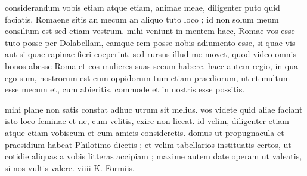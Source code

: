 


 considerandum vobis etiam atque etiam, animae meae, diligenter puto quid faciatis, Romaene sitis an mecum an aliquo tuto loco ; id non solum meum consilium est sed etiam vestrum. mihi veniunt in mentem haec, Romae vos esse tuto posse per Dolabellam, eamque rem posse nobis adiumento esse, si quae vis aut si quae rapinae fieri coeperint. sed rursus illud me movet, quod video omnis bonos abesse Roma et eos mulieres suas secum habere. haec autem regio, in qua ego sum, nostrorum est cum oppidorum tum etiam praediorum, ut et multum esse mecum et, cum abieritis, commode et in nostris esse possitis.

 mihi plane non satis constat adhuc utrum sit melius. vos videte quid aliae faciant isto loco feminae et ne, cum velitis, exire non liceat. id velim, diligenter etiam atque etiam vobiscum et cum amicis consideretis. domus ut propugnacula et praesidium habeat Philotimo dicetis ; et velim tabellarios instituatis certos, ut cotidie aliquas a vobis litteras accipiam ; maxime autem date operam ut valeatis, si nos vultis valere. viiii K. Formiis.
